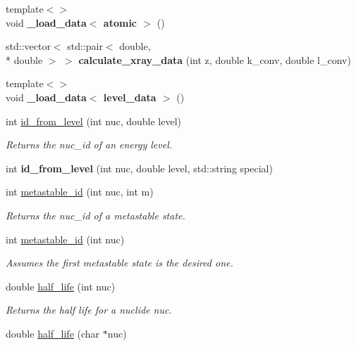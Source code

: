 \begin{DoxyCompactItemize}
\item 
\hypertarget{namespacepyne_a23231dd4e875d332e36d5cdc5cce1341}{{\footnotesize template$<$$>$ }\\void {\bfseries \+\_\+load\+\_\+data$<$ atomic $>$} ()}\label{namespacepyne_a23231dd4e875d332e36d5cdc5cce1341}

\item 
\hypertarget{namespacepyne_afc348e3a1127277ad3deacb309faddf1}{std\+::vector$<$ std\+::pair$<$ double, \\*
double $>$ $>$ {\bfseries calculate\+\_\+xray\+\_\+data} (int z, double k\+\_\+conv, double l\+\_\+conv)}\label{namespacepyne_afc348e3a1127277ad3deacb309faddf1}

\item 
\hypertarget{namespacepyne_ad12885416300033e2563dfe87e764f7c}{{\footnotesize template$<$$>$ }\\void {\bfseries \+\_\+load\+\_\+data$<$ level\+\_\+data $>$} ()}\label{namespacepyne_ad12885416300033e2563dfe87e764f7c}

\item 
int \hyperlink{namespacepyne_a11f4852ba4824c0e047b509efe0c6b8c}{id\+\_\+from\+\_\+level} (int nuc, double level)
\begin{DoxyCompactList}\small\item\em Returns the nuc\+\_\+id of an energy level. \end{DoxyCompactList}\item 
\hypertarget{namespacepyne_aa3d3232f957170f144e412fa170aaa58}{int {\bfseries id\+\_\+from\+\_\+level} (int nuc, double level, std\+::string special)}\label{namespacepyne_aa3d3232f957170f144e412fa170aaa58}

\item 
int \hyperlink{namespacepyne_a2e817a4d6dac740b6fa883ac99272201}{metastable\+\_\+id} (int nuc, int m)
\begin{DoxyCompactList}\small\item\em Returns the nuc\+\_\+id of a metastable state. \end{DoxyCompactList}\item 
\hypertarget{namespacepyne_ae4f71f8816cbdd47588d1c3c5fb4908c}{int \hyperlink{namespacepyne_ae4f71f8816cbdd47588d1c3c5fb4908c}{metastable\+\_\+id} (int nuc)}\label{namespacepyne_ae4f71f8816cbdd47588d1c3c5fb4908c}

\begin{DoxyCompactList}\small\item\em Assumes the first metastable state is the desired one. \end{DoxyCompactList}\item 
double \hyperlink{namespacepyne_a98f776164d1812878cb4b4ee4ef943f5}{half\+\_\+life} (int nuc)
\begin{DoxyCompactList}\small\item\em Returns the half life for a nuclide {\itshape nuc}. \end{DoxyCompactList}\item 
\hypertarget{namespacepyne_a120acb7c7ff96c26ff012aa192212160}{double \hyperlink{namespacepyne_a120acb7c7ff96c26ff012aa192212160}{half\+\_\+life} (char $\ast$nuc)}\label{namespacepyne_a120acb7c7ff96c26ff012aa192212160}


\end{DoxyCompactItemize}

